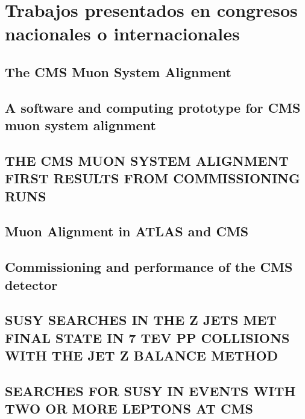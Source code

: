 \documentclass[a4paper, 11pt, twoside, openright]{report}
\begin{document}
\section{Trabajos presentados en congresos nacionales o internacionales}

\subsection{The CMS Muon System Alignment}

\subsection{A software and computing prototype for CMS muon system alignment}

\subsection{THE CMS MUON SYSTEM ALIGNMENT FIRST RESULTS FROM COMMISSIONING RUNS}

\subsection{Muon Alignment in ATLAS and CMS}

\subsection{Commissioning and performance of the CMS detector}

\subsection{SUSY SEARCHES IN THE Z JETS MET FINAL STATE IN 7 TEV PP COLLISIONS WITH THE JET Z BALANCE METHOD}

\subsection{SEARCHES FOR SUSY IN EVENTS WITH TWO OR MORE LEPTONS AT CMS}

\end{document}
